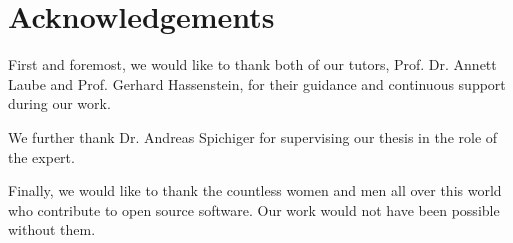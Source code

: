 \chapter*{Acknowledgements}
First and foremost,
we would like to thank both of our tutors,
Prof. Dr. Annett Laube and Prof. Gerhard Hassenstein,
for their guidance and continuous support during our work.

We further thank Dr. Andreas Spichiger for supervising our thesis in the role of the expert.

Finally, we would like to thank the countless women and men all over this world who contribute to open source software.
Our work would not have been possible without them.
